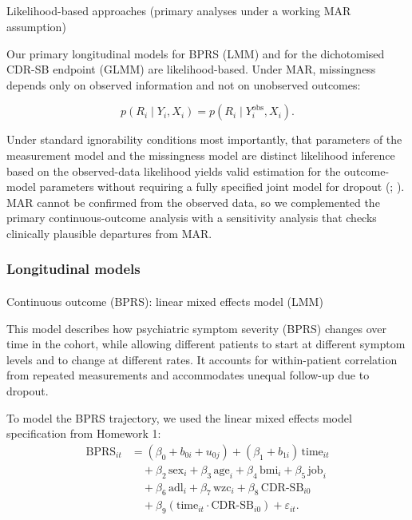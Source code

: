 \documentclass[
  9pt,
  letterpaper,
  DIV=11,
  numbers=noendperiod]{scrartcl}
\makeatletter
\let\oldparagraph\paragraph
\renewcommand{\paragraph}{
    \@ifstar
      \xxxParagraphStar
      \xxxParagraphNoStar
  }
\newcommand{\xxxParagraphStar}[1]{\oldparagraph*{#1}\mbox{}}
\newcommand{\xxxParagraphNoStar}[1]{\oldparagraph{#1}\mbox{}}
\let\oldsubparagraph\subparagraph
\renewcommand{\subparagraph}{
    \@ifstar
      \xxxSubParagraphStar
      \xxxSubParagraphNoStar
  }
\newcommand{\xxxSubParagraphStar}[1]{\oldsubparagraph*{#1}\mbox{}}
\newcommand{\xxxSubParagraphNoStar}[1]{\oldsubparagraph{#1}\mbox{}}
\makeatother
\begin{document}
\subparagraph{Likelihood-based approaches (primary analyses under a
working MAR
assumption)}\label{likelihood-based-approaches-primary-analyses-under-a-working-mar-assumption}

Our primary longitudinal models for BPRS (LMM) and for the dichotomised
CDR-SB endpoint (GLMM) are likelihood-based. Under MAR, missingness
depends only on observed information and not on unobserved outcomes:

\[
p(R_i \mid Y_i, X_i)=p(R_i \mid Y_i^{\mathrm{obs}}, X_i).
\]

Under standard ignorability conditions most importantly, that parameters
of the measurement model and the missingness model are distinct
likelihood inference based on the observed-data likelihood yields valid
estimation for the outcome-model parameters without requiring a fully
specified joint model for dropout
(;
). MAR cannot be confirmed from the observed data, so we
complemented the primary continuous-outcome analysis with a sensitivity
analysis that checks clinically plausible departures from MAR.

\subsubsection{Longitudinal models}\label{longitudinal-models}

\paragraph{Continuous outcome (BPRS): linear mixed effects model
(LMM)}\label{continuous-outcome-bprs-linear-mixed-effects-model-lmm}

This model describes how psychiatric symptom severity (BPRS) changes
over time in the cohort, while allowing different patients to start at
different symptom levels and to change at different rates. It accounts
for within-patient correlation from repeated measurements and
accommodates unequal follow-up due to dropout.

To model the BPRS trajectory, we used the linear mixed effects model
specification from Homework 1: \[
\begin{aligned}
\mathrm{BPRS}_{it} &= (\beta_0 + b_{0i} + u_{0j}) + (\beta_1 + b_{1i})\,\mathrm{time}_{it} \\
&\quad + \beta_2\,\mathrm{sex}_i + \beta_3\,\mathrm{age}_i + \beta_4\,\mathrm{bmi}_i + \beta_5\,\mathrm{job}_i \\
&\quad + \beta_6\,\mathrm{adl}_i + \beta_7\,\mathrm{wzc}_i + \beta_8\,\mathrm{CDR\text{-}SB}_{i0} \\
&\quad + \beta_9\!\left(\mathrm{time}_{it}\cdot \mathrm{CDR\text{-}SB}_{i0}\right) + \varepsilon_{it}.
\end{aligned}
\]
\end{document}
